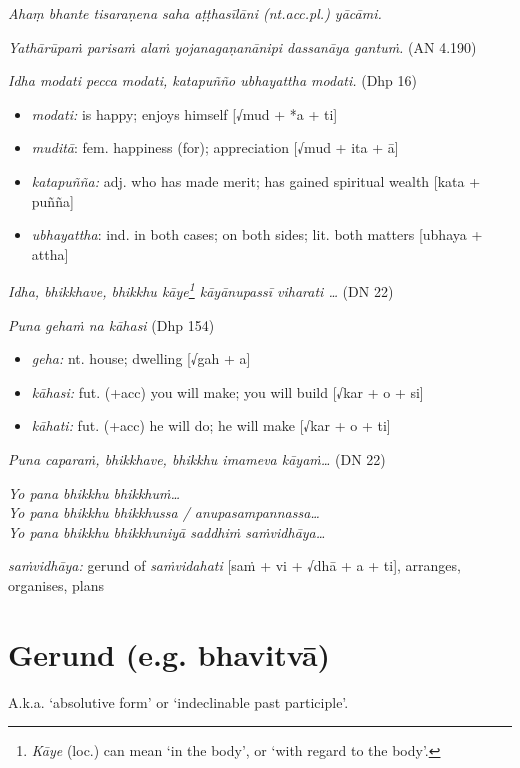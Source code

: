 \documentclass[11pt,oneside]{memoir}
\begin{document}
\emph{Ahaṃ bhante tisaraṇena saha aṭṭhasīlāni (nt.acc.pl.) yācāmi.}

\emph{Yathārūpaṁ parisaṁ alaṁ yojanagaṇanānipi dassanāya gantuṁ.} (AN 4.190)

\emph{Idha modati pecca modati, katapuñño ubhayattha modati.} (Dhp 16)

\begin{itemize}
\item \emph{modati:} is happy; enjoys himself [√mud + *a + ti]
\item \emph{muditā}: fem. happiness (for); appreciation [√mud + ita + ā]
\item \emph{katapuñña:} adj. who has made merit; has gained spiritual wealth [kata + puñña]
\item \emph{ubhayattha}: ind. in both cases; on both sides; lit. both matters [ubhaya + attha]
\end{itemize}

\emph{Idha, bhikkhave, bhikkhu kāye\footnote{\emph{Kāye} (loc.) can mean `in the body', or `with regard to the body'.} kāyānupassī viharati \ldots{}} (DN 22)

\emph{Puna gehaṁ na kāhasi} (Dhp 154)

\begin{itemize}
\item \emph{geha:} nt. house; dwelling [√gah + a]
\item \emph{kāhasi:} fut. (+acc) you will make; you will build [√kar + o + si]
\item \emph{kāhati:} fut. (+acc) he will do; he will make [√kar + o + ti]
\end{itemize}

\emph{Puna caparaṁ, bhikkhave, bhikkhu imameva kāyaṁ\ldots{}} (DN 22)

\emph{Yo pana bhikkhu bhikkhuṁ\ldots{}} \\[0pt]
\emph{Yo pana bhikkhu bhikkhussa / anupasampannassa\ldots{}} \\[0pt]
\emph{Yo pana bhikkhu bhikkhuniyā saddhiṁ saṁvidhāya\ldots{}}

\emph{saṁvidhāya:} gerund of \emph{saṁvidahati} [saṁ + vi + √dhā + a + ti], arranges, organises, plans

\clearpage

\section{Gerund (e.g. bhavitvā)}
\label{sec:orge8606cf}

A.k.a. `absolutive form' or `indeclinable past participle'.
\end{document}
